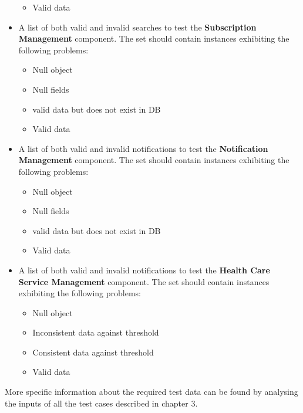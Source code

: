 \documentclass[a4paper, hidelinks, 12pt]{report}
\begin{document}
\begin{itemize}
\begin{itemize}
\item{} Valid data
\end{itemize}
\item{} A list of both valid and invalid searches to test the \textbf{Subscription Management} component. The set should contain instances exhibiting the following problems:
\begin{itemize}
\item{} Null object
\item{} Null fields
\item{} valid data but does not exist in DB
\item{} Valid data
\end{itemize}
\item{} A list of both valid and invalid notifications to test the \textbf{Notification Management} component. The set should contain instances exhibiting the following problems:
\begin{itemize}
\item{} Null object
\item{} Null fields
\item{} valid data but does not exist in DB
\item{} Valid data
\end{itemize}
\item{} A list of both valid and invalid notifications to test the \textbf{Health Care Service Management} component. The set should contain instances exhibiting the following problems:
\begin{itemize}
\item{} Null object
\item{} Inconsistent data against threshold
\item{} Consistent data against threshold
\item{} Valid data
\end{itemize}
\end{itemize}
More specific information about the required test data can be found by analysing the inputs of all the test cases described in chapter 3.
	
\end{document}
